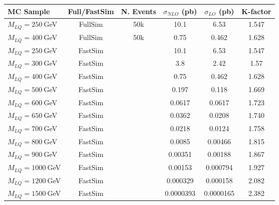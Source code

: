 \begin{table}[htb]
  \label{tab:NumEvents}
  \begin{center}
    \begin{tabular}{|l|ccccc|} \hline\hline
      MC Sample                 & Full/FastSim & N. Events & $\sigma_{NLO}$ (pb) & $\sigma_{LO}$ (pb) & K-factor \\ \hline\hline
      $M_{LQ}=250~$GeV          & FullSim      & 50k       & 10.1                & 6.53               & 1.547\\
      $M_{LQ}=400~$GeV          & FullSim      & 50k       &  0.75               & 0.462              & 1.628\\ \hline
      $M_{LQ}=250~$GeV          & FastSim      &           & 10.1                & 6.53               & 1.547\\
      $M_{LQ}=300~$GeV          & FastSim      &           &  3.8                & 2.42               & 1.57\\
      $M_{LQ}=400~$GeV          & FastSim      &           &  0.75               & 0.462              & 1.628\\
      $M_{LQ}=500~$GeV          & FastSim      &           &  0.197              & 0.118              & 1.669\\
      $M_{LQ}=600~$GeV          & FastSim      &           &  0.0617             & 0.0617             & 1.723\\
      $M_{LQ}=650~$GeV          & FastSim      &           &  0.0362             & 0.0208             & 1.740\\
      $M_{LQ}=700~$GeV          & FastSim      &           &  0.0218             & 0.0124             & 1.758\\
      $M_{LQ}=800~$GeV          & FastSim      &           &  0.0085             & 0.00466            & 1.815\\
      $M_{LQ}=900~$GeV          & FastSim      &           &  0.00351            & 0.00188            & 1.867\\
      $M_{LQ}=1000~$GeV         & FastSim      &           &  0.00153            & 0.000794           & 1.927\\
      $M_{LQ}=1200~$GeV         & FastSim      &           &  0.000329           & 0.000158           & 2.082\\
      $M_{LQ}=1500~$GeV         & FastSim      &           &  0.0000393          & 0.0000165          & 2.382\\ \hline

\end{tabular}
\end{center}
\end{table}
